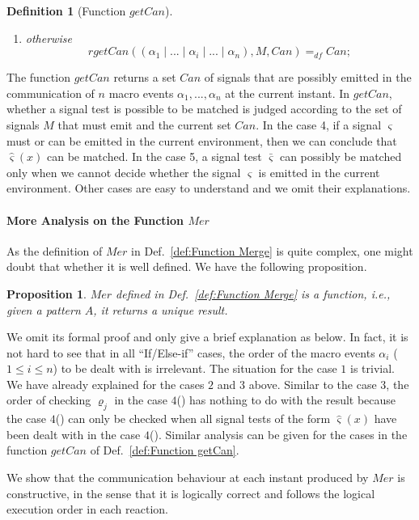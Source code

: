 \documentclass{fcs}
\newtheorem{mydef}{Definition}[section]
\newtheorem{prop}{Proposition}[section]
\newcommand{\rmn}[1]{(\romannumeral#1)}
\newcommand{\sig}[0]{\varsigma}
\DeclareMathOperator{\sep}{|}
\newcommand{\Merge}[0]{\mathit{Mer}}
\newcommand{\Can}[0]{\mathit{Can}}
\newcommand{\getCan}[0]{\mathit{getCan}}
\newcommand{\rgetCan}[0]{\mathit{rgetCan}}
\newcommand{\dddef}[0]{=_{df}}
\begin{document}
\begin{mydef}[Function $\getCan$]
\begin{enumerate}
    \item otherwise
    $$
    \rgetCan((\alpha_1\sep...\sep \alpha_{i}\sep...\sep\alpha_n), M, \Can)\dddef \Can;
    $$

    \end{enumerate}

\end{mydef}

The function $\getCan$ returns a set $\Can$ of signals that are possibly emitted in the communication of $n$ macro events $\alpha_1,...,\alpha_n$ at the current instant.
In $\getCan$, whether a signal test is possible to be matched is judged according to the set of signals $M$ that must emit and the current set $\Can$.
In the case 4,
if a signal $\sig$ must or can be emitted in the current environment, then we can conclude that $\hat{\sig}(x)$ can be matched.
In the case 5, a signal test $\bar{\sig}$ can possibly be matched only when we cannot decide whether the signal $\sig$ is emitted in the current environment.
Other cases are easy to understand and we omit their explanations.


\paragraph{More Analysis on the Function $\Merge$}
As the definition of $\Merge$ in Def.~\ref{def:Function Merge} is quite complex, one might doubt that whether it is well defined.
We have the following proposition.
\begin{prop}
\label{prop:Merge is a function}
$\Merge$ defined in Def.~\ref{def:Function Merge} is a function, i.e., given a pattern $A$, it returns a unique result.
\end{prop}
We omit its formal proof and only give a brief explanation as below.
In fact, it is not hard to see that in all ``If/Else-if'' cases, the order of the macro events $\alpha_i$ ($1\le i\le n$) to be dealt with is irrelevant.
The situation for the case $1$ is trivial.
We have already explained for the cases $2$ and $3$ above.
Similar to the case $3$, the order of checking $\varrho_j$ in the case $4$\rmn{1} has nothing to do with the result because the case $4$\rmn{2} can only be checked when
all signal tests of the form $\hat{\sig}(x)$ have been dealt with in the case $4$\rmn{1}.
Similar analysis can be given for the cases in the function $\getCan$ of Def.~\ref{def:Function getCan}.

We show that the communication behaviour at each instant produced by $\Merge$ is constructive, in the sense that it is logically correct and follows the logical execution order in each reaction.
\end{document}

